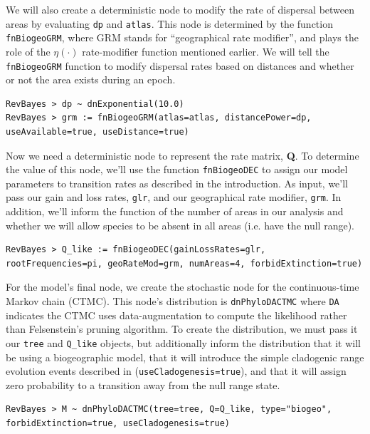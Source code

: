 \documentclass[11pt]{article}
\begin{document}
We will also create a deterministic node to modify the rate of dispersal between areas by evaluating {\tt dp} and {\tt atlas}.
This node is determined by the function {\tt fnBiogeoGRM}, where GRM stands for ``geographical rate modifier'', and plays the role of the $\eta(\cdot)$ rate-modifier function mentioned earlier.
We will tell the {\tt fnBiogeoGRM} function to modify dispersal rates based on distances and whether or not the area exists during an epoch.

\begin{snugshade}
\begin{lstlisting}
RevBayes > dp ~ dnExponential(10.0)
RevBayes > grm := fnBiogeoGRM(atlas=atlas, distancePower=dp, useAvailable=true, useDistance=true)
\end{lstlisting}
\end{snugshade}

Now we need a deterministic node to represent the rate matrix, {\bf Q}.
To determine the value of this node, we'll use the function {\tt fnBiogeoDEC} to assign our model parameters to transition rates as described in the introduction.
As input, we'll pass our gain and loss rates, {\tt glr}, and our geographical rate modifier, {\tt grm}.
In addition, we'll inform the function of the number of areas in our analysis and whether we will allow species to be absent in all areas (i.e. have the null range).

\begin{snugshade}
\begin{lstlisting}
RevBayes > Q_like := fnBiogeoDEC(gainLossRates=glr, rootFrequencies=pi, geoRateMod=grm, numAreas=4, forbidExtinction=true)
\end{lstlisting}
\end{snugshade}

For the model's final node, we create the stochastic node for the continuous-time Markov chain (CTMC).
This node's distribution is {\tt dnPhyloDACTMC} where {\tt DA} indicates the CTMC uses data-augmentation to compute the likelihood rather than Felsenstein's pruning algorithm.
To create the distribution, we must pass it our {\tt tree} and {\tt Q\_like} objects, but additionally inform the distribution that it will be using a biogeographic model, that it will introduce the simple cladogenic range evolution events described in \citet{ree08} ({\tt useCladogenesis=true}), and that it will assign zero probability to a transition away from the null range state.

\begin{snugshade}
\begin{lstlisting}
RevBayes > M ~ dnPhyloDACTMC(tree=tree, Q=Q_like, type="biogeo", forbidExtinction=true, useCladogenesis=true)
\end{lstlisting}
\end{snugshade}
\end{document}
